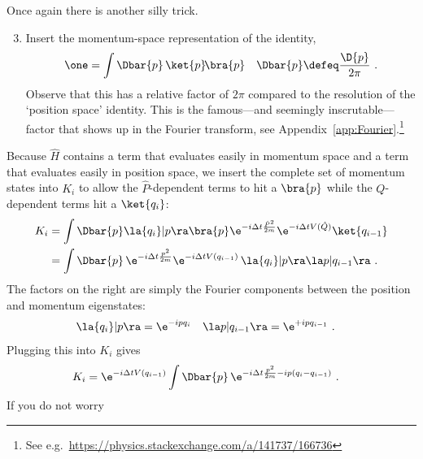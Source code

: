 Once again there is another silly trick. 
\begin{enumerate}
    \setcounter{enumi}{2}
    \item Insert the momentum-space representation of the identity,
    \begin{align}
        \one &= \int \Dbar{p}\, \ket{p}\!\bra{p} 
        &
        \Dbar{p}\defeq \frac{\D{p}}{2\pi} \ .
    \end{align}
    Observe that this has a relative factor of $2\pi$ compared to the resolution of the `position space' identity. This is the famous---and seemingly inscrutable---factor that shows up in the Fourier transform, see Appendix~\ref{app:Fourier}.\footnote{See e.g.\ \url{https://physics.stackexchange.com/a/141737/166736}} 
\end{enumerate}
Because $\hat H$ contains a term that evaluates easily in momentum space and a term that evaluates easily in position space, we insert the complete set of momentum states into $K_i$ to allow the $\hat P$-dependent terms to hit a $\bra{p}$ while the $Q$-dependent terms hit a $\ket{q_i}$:
\begin{align}
    K_i &=
    \int \Dbar{p} \la {q_{i}} | p \ra \bra{p} \e^{-i\Delta t\frac{ \hat P^2}{2m}} \e^{-i\Delta tV(\hat Q)} \ket{q_{i-1}}
    \label{eq:path:integral:Ki:operator}
    \\ &=
    \int \Dbar{p} \, \e^{-i\Delta t\frac{ p^2}{2m}} \e^{-i\Delta tV(q_{i-1})}\,  \la {q_{i}} | p \ra \la p | q_{i-1} \ra  \ .
    \label{eq:path:integral:Ki:eigen}
\end{align}
The factors on the right are simply the Fourier components between the position and momentum eigenstates:
\begin{align}
    \la {q_{i}} | p \ra &= \e^{-ipq_i}
    &
    \la p | q_{i-1} \ra &= \e^{+ipq_{i-1}}
    \ .
\end{align}
Plugging this into $K_i$ gives
\begin{align}
    K_i &=
    \e^{-i\Delta tV(q_{i-1})} \int \Dbar{p} \, \e^{-i\Delta t\frac{ p^2}{2m} - i p(q_i - q_{i-1}) } \ .
\end{align}
If you do not worry 
